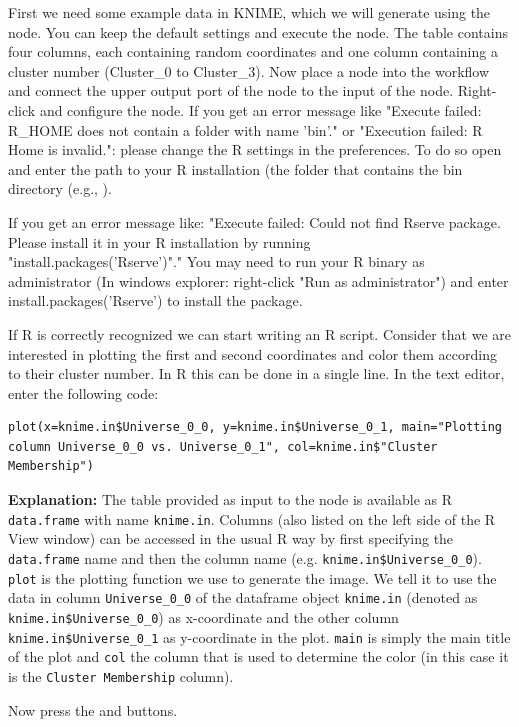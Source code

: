 \begin{task}
First we need some example data in KNIME, which we will generate using the  node. You can 
keep the default settings and execute the node. The table contains four columns, each containing random coordinates 
and one column containing a cluster number (Cluster\_0 to Cluster\_3). Now place a  node 
into the workflow and connect the upper output port of the  node to the input of the 
 node. Right-click and configure the node.
If you get an error message like "Execute failed: R\_HOME does not contain a folder with name 'bin'." or "Execution 
failed: R Home is invalid.": please change the R settings in the preferences. To do so open  and enter the path to your R installation (the folder that contains the bin directory (e.g., ).

If you get an error message like:
"Execute failed: Could not find Rserve package. Please install it in your R installation by running \\ 
"install.packages('Rserve')"." You may need to run your R binary as administrator (In windows explorer: right-click 
"Run as administrator") and enter install.packages('Rserve') to install the package.

If R is correctly recognized we can start writing an R script. Consider that we are interested in plotting the first 
and second coordinates and color them according to their cluster number. In R this can be done in a single line.
In the  text editor, enter the following code:
\begin{lstlisting}
plot(x=knime.in$Universe_0_0, y=knime.in$Universe_0_1, main="Plotting column Universe_0_0 vs. Universe_0_1", col=knime.in$"Cluster Membership")
\end{lstlisting}
        
\textbf{Explanation:}
The table provided as input to the  node is available as R \texttt{data.frame} with name 
\texttt{knime.in}. Columns (also listed on the left side of the R View window) can be accessed in the usual R way by 
first specifying the \texttt{data.frame} name and then the column name (e.g. \texttt{knime.in\$Universe\_0\_0}).
\texttt{plot} is the plotting function we use to generate the image. We tell it to use the data in column 
\texttt{Universe\_0\_0} of the dataframe object \texttt{knime.in} (denoted as \texttt{knime.in\$Universe\_0\_0}) as 
x-coordinate and the other column \texttt{knime.in\$Universe\_0\_1} as y-coordinate in the plot. \texttt{main} is 
simply the main title of the plot and \texttt{col} the column that is used to determine the color (in this case it is 
the \texttt{Cluster Membership} column).

Now press the  and  buttons.
\end{task}


